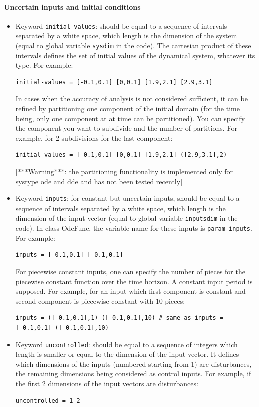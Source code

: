 \documentclass{article}
\begin{document}
\paragraph{Uncertain inputs and initial conditions}
\begin{itemize}
\item Keyword \texttt{initial-values}: should be equal to a sequence of intervals separated by a white space, which length is the dimension of the system (equal to global variable \texttt{sysdim} in the code).  The cartesian product of these intervals defines the set of initial values of the dynamical system, whatever its type. 
For example:
\begin{verbatim}
initial-values = [-0.1,0.1] [0,0.1] [1.9,2.1] [2.9,3.1]
\end{verbatim}
In cases when the accuracy of analysis is not considered sufficient, it can be refined by partitioning one component of the initial domain (for the time being, only one component at at time can be partitioned).  
You can specify the component you want to subdivide and the number of partitions. For example,  for 2 subdivisions for the last component: 
\begin{verbatim}
initial-values = [-0.1,0.1] [0,0.1] [1.9,2.1] ([2.9,3.1],2) 
\end{verbatim}
[***Warning***: the partitioning functionality is implemented only for systype ode and dde and has not been tested recently] 

\item Keyword \texttt{inputs}: for constant but uncertain inputs,  should be equal to a sequence of  intervals separated by a white space,  which length is the dimension of the input vector (equal to global variable \texttt{inputsdim} in the code). In class OdeFunc, the variable name for these inputs is \texttt{param\_inputs}.
For example:
\begin{verbatim}
inputs = [-0.1,0.1] [-0.1,0.1]
\end{verbatim}
For piecewise constant inputs,  one can specify the number of pieces for the piecewise constant function over the time horizon.  A constant input period is supposed.
For example, for an input which first component is constant and second component is piecewise constant with 10 pieces:
\begin{verbatim}
inputs = ([-0.1,0.1],1) ([-0.1,0.1],10) # same as inputs = [-0.1,0.1] ([-0.1,0.1],10)
\end{verbatim}

\item Keyword \texttt{uncontrolled}: should be equal to a sequence of integers which length is smaller or equal to the dimension of the input vector. It defines which dimensions of the inputs (numbered starting from 1) are disturbances, the remaining dimensions being considered as control inputs.
For example,  if the first 2 dimensions of the input vectors are disturbances:
\begin{verbatim}
uncontrolled = 1 2
\end{verbatim}



\end{itemize}
\end{document}
